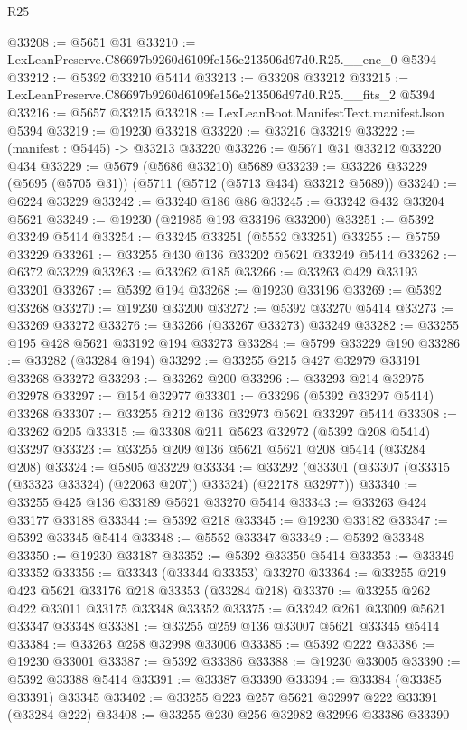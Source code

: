 \begin{lexlean}{R25}
\begin{coremodule}
@33208 := @5651 @31
@33210 := LexLeanPreserve.C86697b9260d6109fe156e213506d97d0.R25.__enc_0 @5394
@33212 := @5392 @33210 @5414
@33213 := @33208 @33212
@33215 := LexLeanPreserve.C86697b9260d6109fe156e213506d97d0.R25.__fits_2 @5394
@33216 := @5657 @33215
@33218 := LexLeanBoot.ManifestText.manifestJson @5394
@33219 := @19230 @33218
@33220 := @33216 @33219
@33222 := (manifest : @5445) -> @33213 @33220
@33226 := @5671 @31 @33212 @33220 @434
@33229 := @5679 (@5686 @33210) @5689
@33239 := @33226 @33229 (@5695 (@5705 @31)) (@5711 (@5712 (@5713 @434) @33212 @5689))
@33240 := @6224 @33229
@33242 := @33240 @186 @86
@33245 := @33242 @432 @33204 @5621
@33249 := @19230 (@21985 @193 @33196 @33200)
@33251 := @5392 @33249 @5414
@33254 := @33245 @33251 (@5552 @33251)
@33255 := @5759 @33229
@33261 := @33255 @430 @136 @33202 @5621 @33249 @5414
@33262 := @6372 @33229
@33263 := @33262 @185
@33266 := @33263 @429 @33193 @33201
@33267 := @5392 @194
@33268 := @19230 @33196
@33269 := @5392 @33268
@33270 := @19230 @33200
@33272 := @5392 @33270 @5414
@33273 := @33269 @33272
@33276 := @33266 (@33267 @33273) @33249
@33282 := @33255 @195 @428 @5621 @33192 @194 @33273
@33284 := @5799 @33229 @190
@33286 := @33282 (@33284 @194)
@33292 := @33255 @215 @427 @32979 @33191 @33268 @33272
@33293 := @33262 @200
@33296 := @33293 @214 @32975 @32978
@33297 := @154 @32977
@33301 := @33296 (@5392 @33297 @5414) @33268
@33307 := @33255 @212 @136 @32973 @5621 @33297 @5414
@33308 := @33262 @205
@33315 := @33308 @211 @5623 @32972 (@5392 @208 @5414) @33297
@33323 := @33255 @209 @136 @5621 @5621 @208 @5414 (@33284 @208)
@33324 := @5805 @33229
@33334 := @33292 (@33301 (@33307 (@33315 (@33323 @33324) (@22063 @207)) @33324) (@22178 @32977))
@33340 := @33255 @425 @136 @33189 @5621 @33270 @5414
@33343 := @33263 @424 @33177 @33188
@33344 := @5392 @218
@33345 := @19230 @33182
@33347 := @5392 @33345 @5414
@33348 := @5552 @33347
@33349 := @5392 @33348
@33350 := @19230 @33187
@33352 := @5392 @33350 @5414
@33353 := @33349 @33352
@33356 := @33343 (@33344 @33353) @33270
@33364 := @33255 @219 @423 @5621 @33176 @218 @33353 (@33284 @218)
@33370 := @33255 @262 @422 @33011 @33175 @33348 @33352
@33375 := @33242 @261 @33009 @5621 @33347 @33348
@33381 := @33255 @259 @136 @33007 @5621 @33345 @5414
@33384 := @33263 @258 @32998 @33006
@33385 := @5392 @222
@33386 := @19230 @33001
@33387 := @5392 @33386
@33388 := @19230 @33005
@33390 := @5392 @33388 @5414
@33391 := @33387 @33390
@33394 := @33384 (@33385 @33391) @33345
@33402 := @33255 @223 @257 @5621 @32997 @222 @33391 (@33284 @222)
@33408 := @33255 @230 @256 @32982 @32996 @33386 @33390

\end{coremodule}
\end{lexlean}
